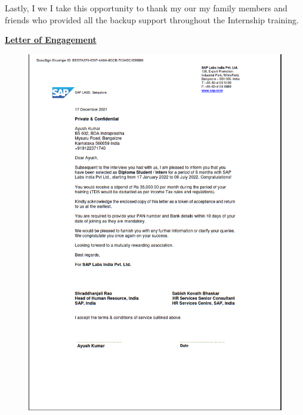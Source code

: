 Lastly, \ifPG I \else\ifStuNameBUsed we \else I \fi\fi take this opportunity to thank \ifPG my \else\ifStuNameBUsed our \else my \fi\fi family members and friends who provided all the backup support throughout the Internship training.\\ \par


\newpage
{}
\thispagestyle{empty}
\begin{center}
  \Large\textbf{\underline{Letter of Engagement}} \par

  \begin{figure}[H]
    \centering
    \includegraphics[scale=0.5]{Figures/internship_offer.png}
    \label{}
  \end{figure}
\end{center}